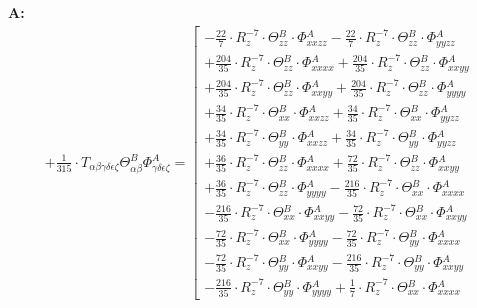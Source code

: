 \documentclass{article}
\begin{document}
\textbf{A:}
\begin{subequations}\begin{gather}
+ \frac{1}{315} \cdot T_{\alpha{}\beta{}\gamma{}\delta{}\epsilon{}\zeta{}} \Theta{}^{B}_{\alpha{}\beta{}} \Phi{}^{A}_{\gamma{}\delta{}\epsilon{}\zeta{}} =  \left[ \begin{array}{c} 
 		- \frac{22}{7} \cdot R_{z}^{-7} \cdot \Theta{}^{B}_{zz} \cdot \Phi{}^{A}_{xxzz}- \frac{22}{7} \cdot R_{z}^{-7} \cdot \Theta{}^{B}_{zz} \cdot \Phi{}^{A}_{yyzz} 
 \\[0.2em] 		 + \frac{204}{35} \cdot R_{z}^{-7} \cdot \Theta{}^{B}_{zz} \cdot \Phi{}^{A}_{xxxx}+ \frac{204}{35} \cdot R_{z}^{-7} \cdot \Theta{}^{B}_{zz} \cdot \Phi{}^{A}_{xxyy} 
 \\[0.2em] 		 + \frac{204}{35} \cdot R_{z}^{-7} \cdot \Theta{}^{B}_{zz} \cdot \Phi{}^{A}_{xxyy}+ \frac{204}{35} \cdot R_{z}^{-7} \cdot \Theta{}^{B}_{zz} \cdot \Phi{}^{A}_{yyyy} 
 \\[0.2em] 		 + \frac{34}{35} \cdot R_{z}^{-7} \cdot \Theta{}^{B}_{xx} \cdot \Phi{}^{A}_{xxzz}+ \frac{34}{35} \cdot R_{z}^{-7} \cdot \Theta{}^{B}_{xx} \cdot \Phi{}^{A}_{yyzz} 
 \\[0.2em] 		 + \frac{34}{35} \cdot R_{z}^{-7} \cdot \Theta{}^{B}_{yy} \cdot \Phi{}^{A}_{xxzz}+ \frac{34}{35} \cdot R_{z}^{-7} \cdot \Theta{}^{B}_{yy} \cdot \Phi{}^{A}_{yyzz} 
 \\[0.2em] 		 + \frac{36}{35} \cdot R_{z}^{-7} \cdot \Theta{}^{B}_{zz} \cdot \Phi{}^{A}_{xxxx}+ \frac{72}{35} \cdot R_{z}^{-7} \cdot \Theta{}^{B}_{zz} \cdot \Phi{}^{A}_{xxyy} 
 \\[0.2em] 		 + \frac{36}{35} \cdot R_{z}^{-7} \cdot \Theta{}^{B}_{zz} \cdot \Phi{}^{A}_{yyyy}- \frac{216}{35} \cdot R_{z}^{-7} \cdot \Theta{}^{B}_{xx} \cdot \Phi{}^{A}_{xxxx} 
 \\[0.2em] 		 - \frac{216}{35} \cdot R_{z}^{-7} \cdot \Theta{}^{B}_{xx} \cdot \Phi{}^{A}_{xxyy}- \frac{72}{35} \cdot R_{z}^{-7} \cdot \Theta{}^{B}_{xx} \cdot \Phi{}^{A}_{xxyy} 
 \\[0.2em] 		 - \frac{72}{35} \cdot R_{z}^{-7} \cdot \Theta{}^{B}_{xx} \cdot \Phi{}^{A}_{yyyy}- \frac{72}{35} \cdot R_{z}^{-7} \cdot \Theta{}^{B}_{yy} \cdot \Phi{}^{A}_{xxxx} 
 \\[0.2em] 		 - \frac{72}{35} \cdot R_{z}^{-7} \cdot \Theta{}^{B}_{yy} \cdot \Phi{}^{A}_{xxyy}- \frac{216}{35} \cdot R_{z}^{-7} \cdot \Theta{}^{B}_{yy} \cdot \Phi{}^{A}_{xxyy} 
 \\[0.2em] 		 - \frac{216}{35} \cdot R_{z}^{-7} \cdot \Theta{}^{B}_{yy} \cdot \Phi{}^{A}_{yyyy}+ \frac{1}{7} \cdot R_{z}^{-7} \cdot \Theta{}^{B}_{xx} \cdot \Phi{}^{A}_{xxxx} 

\end{array}
\end{gather}
\end{subequations}
\end{document}
